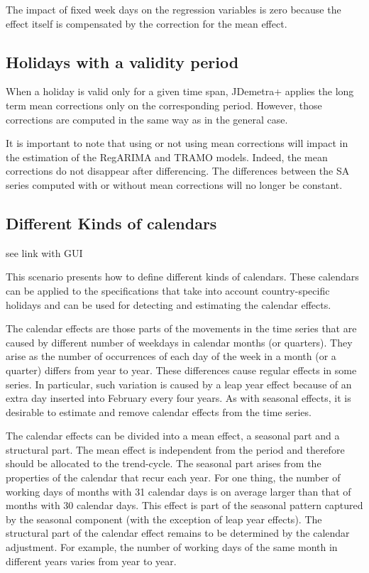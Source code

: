\documentclass[
  letterpaper,
  DIV=11,
  numbers=noendperiod]{scrreprt}
\begin{document}
The impact of fixed week days on the regression variables is zero
because the effect itself is compensated by the correction for the mean
effect.

\hypertarget{holidays-with-a-validity-period}{%
\subsection{Holidays with a validity
period}\label{holidays-with-a-validity-period}}

When a holiday is valid only for a given time span, JDemetra+ applies
the long term mean corrections only on the corresponding period.
However, those corrections are computed in the same way as in the
general case.

It is important to note that using or not using mean corrections will
impact in the estimation of the RegARIMA and TRAMO models. Indeed, the
mean corrections do not disappear after differencing. The differences
between the SA series computed with or without mean corrections will no
longer be constant.

\hypertarget{different-kinds-of-calendars}{%
\subsection{Different Kinds of
calendars}\label{different-kinds-of-calendars}}

see link with GUI

This scenario presents how to define different kinds of calendars. These
calendars can be applied to the specifications that take into account
country-specific holidays and can be used for detecting and estimating
the calendar effects.

The calendar effects are those parts of the movements in the time series
that are caused by different number of weekdays in calendar months (or
quarters). They arise as the number of occurrences of each day of the
week in a month (or a quarter) differs from year to year. These
differences cause regular effects in some series. In particular, such
variation is caused by a leap year effect because of an extra day
inserted into February every four years. As with seasonal effects, it is
desirable to estimate and remove calendar effects from the time series.

The calendar effects can be divided into a mean effect, a seasonal part
and a structural part. The mean effect is independent from the period
and therefore should be allocated to the trend-cycle. The seasonal part
arises from the properties of the calendar that recur each year. For one
thing, the number of working days of months with 31 calendar days is on
average larger than that of months with 30 calendar days. This effect is
part of the seasonal pattern captured by the seasonal component (with
the exception of leap year effects). The structural part of the calendar
effect remains to be determined by the calendar adjustment. For example,
the number of working days of the same month in different years varies
from year to year.
\end{document}
